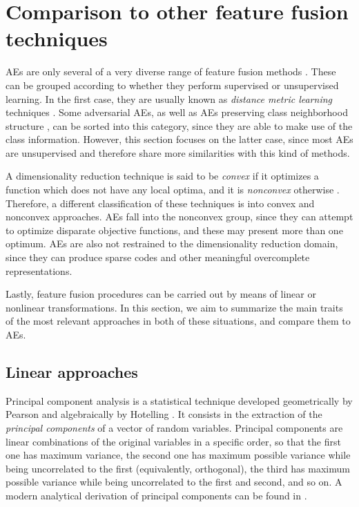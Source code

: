 \documentclass[preprint,5p,compress]{elsarticle}
\begin{document}
\section{Comparison to other feature fusion techniques}\label{Sec.Relationship}

AEs are only several of a very diverse range of feature fusion methods \cite{FeatureFusion}. These can be grouped according to whether they perform supervised or unsupervised learning. In the first case, they are usually known as \textit{distance metric learning} techniques \cite{DistanceMetric}. Some adversarial AEs, as well as AEs preserving class neighborhood structure \cite{NonlinearEmbeddingNN}, can be sorted into this category, since they are able to make use of the class information. However, this section focuses on the latter case, since most AEs are unsupervised and therefore share more similarities with this kind of methods.

A dimensionality reduction technique is said to be \textit{convex} if it optimizes a function which does not have any local optima, and it is \textit{nonconvex} otherwise \cite{DimRecComparative}. Therefore, a different classification of these techniques is into convex and nonconvex approaches. AEs fall into the nonconvex group, since they can attempt to optimize disparate objective functions, and these may present more than one optimum. AEs are also not restrained to the dimensionality reduction domain, since they can produce sparse codes and other meaningful overcomplete representations.

Lastly, feature fusion procedures can be carried out by means of linear or nonlinear transformations. In this section, we aim to summarize the main traits of the most relevant approaches in both of these situations, and compare them to AEs. 

\subsection{Linear approaches}

Principal component analysis is a statistical technique developed geometrically by Pearson \cite{PCA} and algebraically by Hotelling \cite{PCAHotelling}. It consists in the extraction of the \textit{principal components} of a vector of random variables. Principal components are linear combinations of the original variables in a specific order, so that the first one has maximum variance, the second one has maximum possible variance while being uncorrelated to the first (equivalently, orthogonal), the third has maximum possible variance while being uncorrelated to the first and second, and so on. A modern analytical derivation of principal components can be found in \cite{PCABook}.
\end{document}
